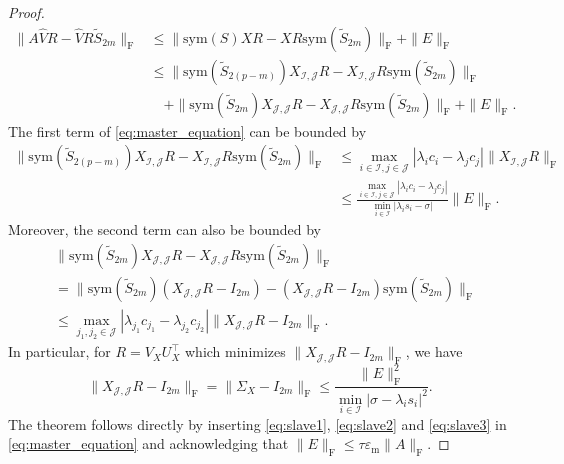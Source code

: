\documentclass[10pt,twoside,dvipsnames]{siamart1116}
\numberwithin{algorithm}{section}
\numberwithin{equation}{section}
\begin{document}
\begin{proof}
\begin{align}
\nonumber
	\|A\widehat{V}R-\widehat{V}R\widetilde{S}_{2m}\|_\mathrm{F}&\leq\|\mathrm{sym}(S)XR-XR\mathrm{sym}(\widetilde{S}_{2m})\|_\mathrm{F}+\|E\|_\mathrm{F}\\
	\label{eq:master_equation}
	&\leq \|\mathrm{sym}(\widetilde{S}_{2(p-m)})X_{\mathcal{I},\mathcal{J}}R-X_{\mathcal{I},\mathcal{J}}R\mathrm{sym}(\widetilde{S}_{2m})\|_\mathrm{F}\\
	\nonumber
	&\quad +\|\mathrm{sym}(\widetilde{S}_{2m})X_{\mathcal{J},\mathcal{J}}R-X_{\mathcal{J},\mathcal{J}}R\mathrm{sym}(\widetilde{S}_{2m})\|_\mathrm{F}+\|E\|_\mathrm{F}.
\end{align}
The first term of \eqref{eq:master_equation} can be bounded by
\begin{align}
\nonumber
	\|\mathrm{sym}(\widetilde{S}_{2(p-m)})X_{\mathcal{I},\mathcal{J}}R-X_{\mathcal{I},\mathcal{J}}R\mathrm{sym}(\widetilde{S}_{2m})\|_\mathrm{F}&\leq  \max_{i\in\mathcal{I},j\in\mathcal{J}}|\lambda_i c_i-\lambda_j c_j|\|X_{\mathcal{I},\mathcal{J}}R\|_\mathrm{F}\\
	\label{eq:slave1}
	&\leq \frac{\max_{i\in\mathcal{I},j\in\mathcal{J}}|\lambda_i c_i-\lambda_j c_j|}{\min_{i\in\mathcal{I}}|\lambda_i s_i-\sigma|}\|E\|_\mathrm{F}.
\end{align}
Moreover, the second term can also be bounded by
\begin{align}
\nonumber
&\|\mathrm{sym}(\widetilde{S}_{2m})X_{\mathcal{J},\mathcal{J}}R-X_{\mathcal{J},\mathcal{J}}R\mathrm{sym}(\widetilde{S}_{2m})\|_\mathrm{F}\\
\nonumber
&= \|\mathrm{sym}(\widetilde{S}_{2m})(X_{\mathcal{J},\mathcal{J}}R-I_{2m})-(X_{\mathcal{J},\mathcal{J}}R-I_{2m})\mathrm{sym}(\widetilde{S}_{2m})\|_\mathrm{F}\\
\label{eq:slave2}
&\leq  \max_{j_1,j_2\in\mathcal{J}}|\lambda_{j_1} c_{j_1}-\lambda_{j_2} c_{j_2}|\|X_{\mathcal{J},\mathcal{J}}R-I_{2m}\|_\mathrm{F}.
\end{align}
In particular, for $R=V_X U_X^\top$ which minimizes $\|X_{\mathcal{J},\mathcal{J}}R-I_{2m}\|_\mathrm{F}$, we have 
\begin{equation}\label{eq:slave3}
\|X_{\mathcal{J},\mathcal{J}}R-I_{2m}\|_\mathrm{F}=\|\Sigma_X-I_{2m}\|_\mathrm{F}\leq \frac{\|E\|_\mathrm{F}^2}{\min_{i\in\mathcal{I}}|\sigma-\lambda_i s_i|^2}.  
\end{equation}
The theorem follows directly by inserting \eqref{eq:slave1}, \eqref{eq:slave2} and \eqref{eq:slave3} in \eqref{eq:master_equation} and acknowledging that  $\|E\|_\mathrm{F}\leq \tau \varepsilon_\mathrm{m} \|A\|_\mathrm{F}$.
\end{proof}
 
\end{document}
